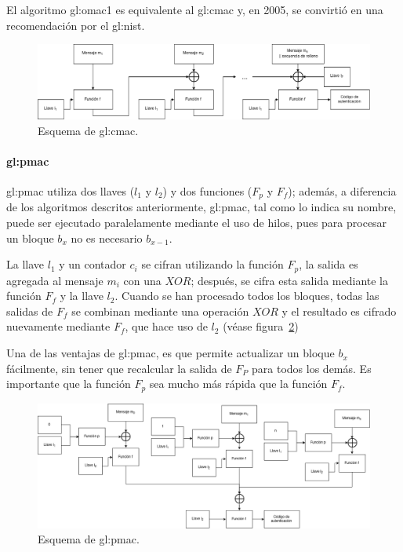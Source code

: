 El algoritmo \gls{gl:omac}1 es equivalente al \gls{gl:cmac} y, en 2005, se
convirtió en una recomendación por el \gls{gl:nist}.

\begin{figure}
  \begin{center}
    \includegraphics[width=0.9\linewidth]{diagramas/cmac.png}
    \caption{Esquema de \gls{gl:cmac}.}
    \label{mac:cmac}
  \end{center}
\end{figure}

\paragraph{\texorpdfstring{\acrlong{gl:pmac}}{Parallel MAC}}
\Gls{gl:pmac} utiliza dos llaves ($l_1$ y $l_2$) y dos funciones
($F_p$ y $F_f$); además, a diferencia de los algoritmos descritos anteriormente,
\gls{gl:pmac}, tal como lo indica su nombre, puede ser ejecutado paralelamente
mediante el uso de hilos, pues para procesar un bloque $b_x$ no es necesario
$b_{x-1}$.

La llave $l_1$ y un contador $c_i$ se cifran utilizando la función
$F_p$, la salida es agregada al mensaje $m_i$ con una $XOR$; después, se cifra
esta salida mediante la función $F_f$ y la llave $l_2$. Cuando se han procesado
todos los bloques, todas las salidas de $F_f$ se combinan mediante una operación
$XOR$ y el resultado es cifrado nuevamente mediante $F_f$, que hace uso de
$l_2$ (véase figura~\ref{mac:pmac})

Una de las ventajas de \gls{gl:pmac}, es que permite actualizar un bloque $b_x$
fácilmente, sin tener que recalcular la salida de $F_P$ para todos los demás.
Es importante que la función $F_p$ sea mucho más rápida que la función $F_f$.

\begin{figure}
  \begin{center}
    \includegraphics[width=0.9\linewidth]{diagramas/pmac.png}
    \caption{Esquema de \gls{gl:pmac}.}
    \label{mac:pmac}
  \end{center}
\end{figure}

